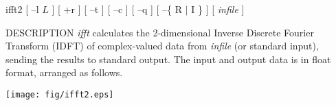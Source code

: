 % 
% 
% 
% 
%                                                                        
%
\hypertarget{ifft2}{}

\begin{synopsis}
\item[ifft2] [ --l $L$ ] [ +r ] [ --t ] [ --c ] [ --q ] 
	     [ --\{ R $|$ I \} ] [ {\em infile} ]
\end{synopsis}

\begin{qsection}{DESCRIPTION}
{\em ifft} calculates the 2-dimensional Inverse Discrete Fourier Transform
(IDFT) of complex-valued data from {\em infile} (or standard input), 
sending the results to standard output.
The input and output data is in float format, arranged as follows.
\begin{center}
\leavevmode
\texttt{[image: fig/ifft2.eps]}
\end{center}
\end{qsection}

